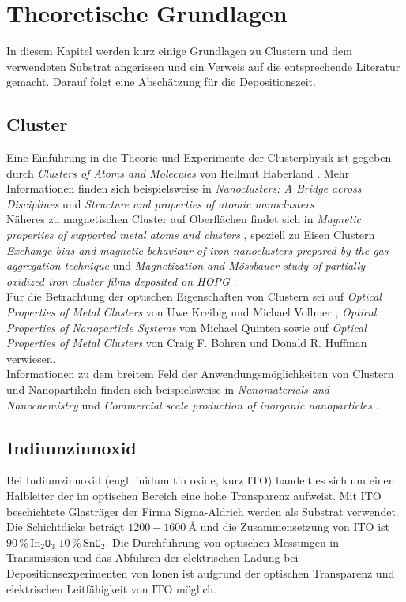 \chapter{Theoretische Grundlagen}
In diesem Kapitel werden kurz einige Grundlagen zu Clustern und dem verwendeten Substrat angerissen und ein Verweis auf die entsprechende Literatur gemacht. Darauf folgt eine Abschätzung für die Depositionszeit.
\section{Cluster}
Eine Einführung in die Theorie und Experimente der Clusterphysik ist gegeben durch \textit{Clusters of Atoms and Molecules} von Hellmut Haberland \cite{haberland}.
Mehr Informationen finden sich beispielsweise in \textit{Nanoclusters: A Bridge across Disciplines} \cite{Jena.2011} und \textit{Structure and properties of atomic nanoclusters} \cite{Alonso.2005}\\
Näheres zu magnetischen Cluster auf Oberflächen findet sich in \textit{Magnetic properties of supported metal atoms and clusters} \cite{Martins.2016}, speziell zu Eisen Clustern 
\textit{Exchange bias and magnetic behaviour of iron nanoclusters prepared by the gas aggregation technique} \cite{SanchezMarcos.2012} und
\textit{Magnetization and M{\"o}ssbauer study of partially oxidized iron cluster films deposited on HOPG} \cite{TarrasWahlberg.2014}.\\
Für die Betrachtung der optischen Eigenschaften von Clustern sei auf \textit{Optical Properties of Metal Clusters} von Uwe Kreibig und Michael Vollmer \cite{kreibig}, \textit{Optical Properties of Nanoparticle Systems} von Michael Quinten \cite{Quinten.2011} sowie auf \textit{Optical Properties of Metal Clusters} von Craig F. Bohren und Donald R. Huffman \cite{Bohren.1998} verwiesen.\\
Informationen zu dem breitem Feld der Anwendungsmöglichkeiten von Clustern und Nanopartikeln finden sich beispielsweise in \textit{Nanomaterials and Nanochemistry} \cite{Brechignac.2007} und \textit{Commercial scale production of inorganic nanoparticles} \cite{Tsuzuki.2009}.

\section{Indiumzinnoxid}
Bei Indiumzinnoxid (engl. inidum tin oxide, kurz ITO) handelt es sich um einen Halbleiter der im optischen Bereich eine hohe Transparenz aufweist.  
Mit ITO beschichtete Glasträger der Firma Sigma-Aldrich \cite{sigmaaldrich} werden als Substrat verwendet.
Die Schichtdicke beträgt $1200-1600\SI{}{\angstrom}$ und die Zusammensetzung von ITO ist $90\,\% \,\text{In}_2\texttt{O}_3$ $10\,\% \,\text{Sn}\texttt{O}_2$.
Die Durchführung von optischen Messungen in Transmission und das Abführen der elektrischen Ladung bei Depositionsexperimenten von Ionen ist aufgrund der optischen Transparenz und elektrischen Leitfähigkeit von ITO möglich.

